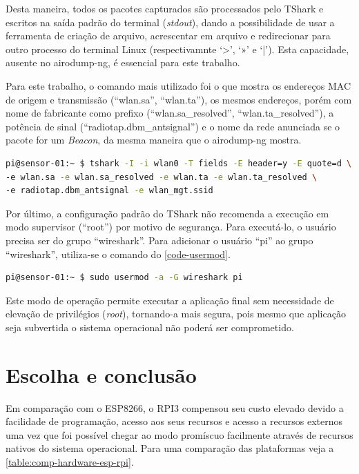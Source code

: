 Desta maneira, todos os pacotes capturados são processados pelo TShark e
escritos na saída padrão do terminal (\emph{stdout}), dando a possibilidade de
usar a ferramenta de criação de arquivo, acrescentar em arquivo e redirecionar
para outro processo do terminal Linux (respectivamnte ‘>’, ‘»’ e ‘|’). Esta
capacidade, ausente no airodump-ng, é essencial para este trabalho.

Para este trabalho, o comando mais utilizado foi o que mostra os endereços MAC
de origem e transmissão (``wlan.sa'', ``wlan.ta''), os mesmos endereços, porém com nome
de fabricante como prefixo (``wlan.sa\_resolved'', ``wlan.ta\_resolved''), a potência de
sinal (``radiotap.dbm\_antsignal'') e o nome da rede anunciada se o pacote for um
\emph{Beacon}, da mesma maneira que o airodump-ng mostra.

\begin{lstlisting}[language=bash,caption={TShark e opções},label=code-tshark]
pi@sensor-01:~ $ tshark -I -i wlan0 -T fields -E header=y -E quote=d \
-e wlan.sa -e wlan.sa_resolved -e wlan.ta -e wlan.ta_resolved \
-e radiotap.dbm_antsignal -e wlan_mgt.ssid
\end{lstlisting}

Por último, a configuração padrão do TShark não recomenda a execução em modo
supervisor (``root'') por motivo de segurança. Para executá-lo, o usuário precisa ser do
grupo ``wireshark''. Para adicionar o usuário ``pi'' ao grupo ``wireshark'', utiliza-se o comando do
\autoref{code-usermod}.

\begin{lstlisting}[language=bash,caption={Adição do usuário pi ao grupo wireshark},label=code-usermod]
pi@sensor-01:~ $ sudo usermod -a -G wireshark pi
\end{lstlisting}

Este modo de operação permite executar a aplicação final sem necessidade de
elevação de privilégios (\emph{root}), tornando-a mais segura, pois mesmo que
aplicação seja subvertida o sistema operacional não poderá ser comprometido.

\section{Escolha e conclusão}
\label{sec:escolha-plataforma}

Em comparação com o ESP8266, o RPI3 compensou seu custo elevado devido a
facilidade de programação, acesso aos seus recursos e acesso a recursos externos uma
vez que foi possível chegar ao modo promíscuo facilmente através de recursos nativos do
sistema operacional. Para uma comparação das plataformas veja a \autoref{table:comp-hardware-esp-rpi}.

